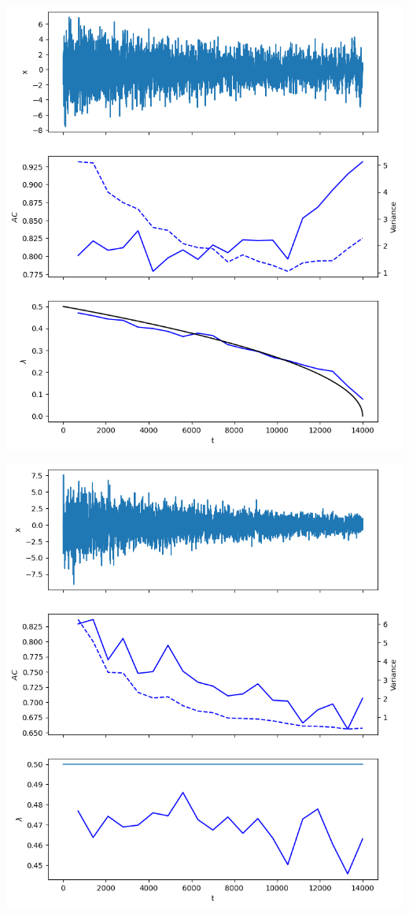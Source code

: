 \documentclass[%
thesis=student,%
coverpage=false,%
titlepage=false,%
headmarks=true, %
german,%
font=libertine, %
math=newpxtx, %
BCOR=5mm,%
coverBCOR=11mm%
]{tumbook}
\begin{document}
\begin{minipage}{0.49\textwidth}
        \centering
        \includegraphics[width=\textwidth]{figures/false_negative_var.png}
    \end{minipage}
    \hfill
    \begin{minipage}{0.49\textwidth}
        \centering
        \includegraphics[width=\textwidth]{figures/true_negative.png}
    \end{minipage}
\end{document}
